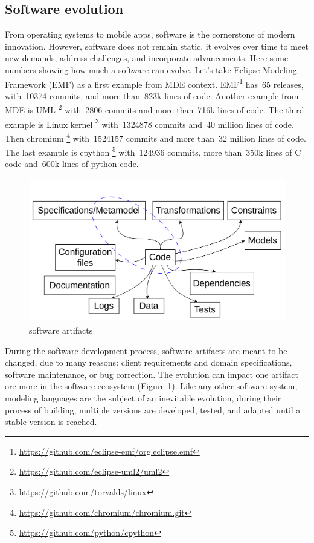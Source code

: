 \subsection{Software evolution}
From operating systems to mobile apps, software is the cornerstone of modern innovation. However, software does not remain static, it evolves over time to meet new demands, address challenges, and incorporate advancements. Here some numbers showing how much a software can evolve. Let's take Eclipse Modeling Framework (EMF) as a first example from MDE context. EMF\footnote{\url{https://github.com/eclipse-emf/org.eclipse.emf}} has~65 releases, with~10374 commits, and more than~823k lines of code. Another example from MDE is UML \footnote{\url{https://github.com/eclipse-uml2/uml2}} with~2806 commits and more than~716k lines of code. The third example is Linux kernel \footnote{\url{https://github.com/torvalds/linux}} with~1324878 commits and~40 million lines of code. Then
chromium \footnote{\url{https://github.com/chromium/chromium.git}} with~1524157 commits and more than~32 million lines of code. The last example is
cpython \footnote{\url{https://github.com/python/cpython}} with~124936 commits, more than~350k lines of C code and~600k lines of python code.
\begin{figure}[t]
	\begin{center}
		\includegraphics[width=0.6\linewidth]{./pics/soaPics/softwareartifacts.png}
	\end{center}
	\caption{software artifacts}
	\label{fig:softwareartifacts}
\end{figure}
During the software development process, software artifacts are meant to be changed, due to many reasons: client requirements and domain specifications, software maintenance, or bug correction. The evolution can impact one artifact ore more in the software ecosystem (Figure \ref{fig:softwareartifacts}). Like any other software system, modeling languages are the subject of an inevitable evolution, during their process of building, multiple versions are developed, tested, and adapted until a stable version is reached. 

